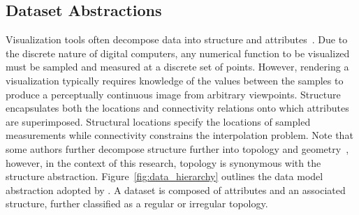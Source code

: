 \subsection{Dataset Abstractions}
Visualization tools often decompose data into structure and
attributes~\cite{vtk}. Due to the discrete nature of digital
computers, any numerical function to be visualized must be sampled and
measured at a discrete set of points. However, rendering a
visualization typically requires knowledge of the values between the
samples to produce a perceptually continuous image from arbitrary
viewpoints. Structure encapsulates both the locations and connectivity
relations onto which attributes are superimposed. Structural locations
specify the locations of sampled measurements while connectivity
constrains the interpolation problem. Note that some authors further
decompose structure further into topology and geometry~\cite{weiler},
however, in the context of this research, topology is synonymous with
the structure abstraction. Figure~\ref{fig:data_hierarchy} outlines
the data model abstraction adopted by \sciwms{}. A dataset is composed
of attributes and an associated structure, further classified as a
regular or irregular topology.

